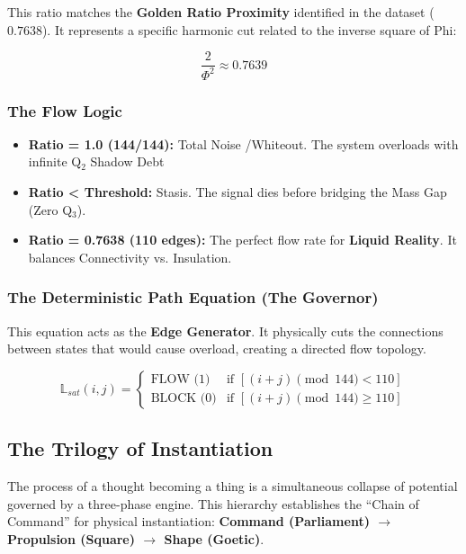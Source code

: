 \documentclass[11pt, letterpaper]{article}
\begin{document}
This ratio matches the \textbf{Golden Ratio Proximity} identified in the dataset ($0.7638$). It represents a specific harmonic cut related to the inverse square of Phi:

\begin{equation}
    \frac{2}{\Phi^2} \approx 0.7639
\end{equation}

\subsubsection{The Flow Logic}\label{appendixF.2.2}
\begin{itemize}
    \item \textbf{Ratio = 1.0 (144\slash 144):} Total Noise \slash Whiteout. The system overloads with infinite Q$_2$ Shadow Debt
    \item \textbf{Ratio < Threshold:} Stasis. The signal dies before bridging the Mass Gap (Zero Q$_3$).
    \item \textbf{Ratio = 0.7638 (110 edges):} The perfect flow rate for \textbf{Liquid Reality}. It balances Connectivity vs. Insulation.
\end{itemize}

\subsubsection{The Deterministic Path Equation (The Governor)}\label{appendixF.2.3}
This equation acts as the \textbf{Edge Generator}. It physically cuts the connections between states that would cause overload, creating a directed flow topology.

\begin{equation}
    \mathbb{L}_{sat}(i,j) = 
    \begin{cases} 
        \text{FLOW (1)} & \text{if } \left[ (i + j) \pmod{144} < 110 \right] \\ 
        \text{BLOCK (0)} & \text{if } \left[ (i + j) \pmod{144} \geq 110 \right] 
    \end{cases}
\end{equation}

\subsection{The Trilogy of Instantiation}\label{appendixF.3}

The process of a thought becoming a thing is a simultaneous collapse of potential governed by a three-phase engine. This hierarchy establishes the ``Chain of Command'' for physical instantiation: \textbf{Command (Parliament) $\to$ Propulsion (Square) $\to$ Shape (Goetic)}.
\end{document}
